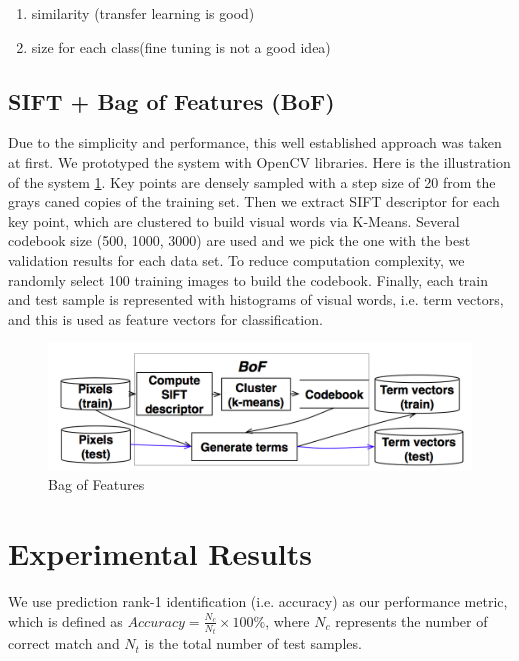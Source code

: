 \documentclass[journal, 10pt]{IEEEtran}
\begin{document}
    \begin{enumerate}
      \item similarity (transfer learning is good)
      \item size for each class(fine tuning is not a good idea)
    \end{enumerate}

    \subsection{SIFT + Bag of Features (BoF) }
   Due to the simplicity and performance, this well established approach was taken at first.  We prototyped the system with OpenCV libraries.  Here is the illustration of the system \ref{fig:bofsystemdesign}.
 Key points are densely sampled with a step size of 20 from the grays caned copies of the training set. Then we extract SIFT descriptor for each key point, which are clustered to build visual words via K-Means. Several codebook size (500, 1000, 3000) are used and we pick the one with the best validation results for each data set. To reduce computation complexity, we randomly select 100 training images to build the codebook.  Finally, each train and test sample is represented with histograms of visual words, i.e. term vectors, and this is used as feature vectors for classification.
\begin{figure}[H]
  \centering
  \includegraphics[width=1.00\linewidth]{bof}
  \caption{ Bag of Features }
  \label{fig:bofsystemdesign}
\end{figure}

\section{Experimental Results}
We use prediction rank-1 identification (i.e. accuracy) as our performance metric, which is defined as $Accuracy = \frac{N_c}{N_t} \times 100 \%$, where $N_c$ represents the number of correct match and $N_t$ is the total number of test samples.
\end{document}
